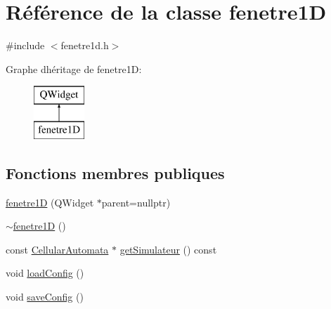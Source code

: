 \hypertarget{classfenetre1_d}{}\section{Référence de la classe fenetre1D}
\label{classfenetre1_d}


{\ttfamily \#include $<$fenetre1d.\+h$>$}

Graphe d\textquotesingle{}héritage de fenetre1D\+:\begin{figure}[H]
\begin{center}
\leavevmode
\includegraphics[height=2.000000cm]{classfenetre1_d}
\end{center}
\end{figure}
\subsection*{Fonctions membres publiques}
\begin{DoxyCompactItemize}
\item 
\mbox{\hyperlink{classfenetre1_d_adb843e57f0ba835052dfd216c82991ed}{fenetre1D}} (Q\+Widget $\ast$parent=nullptr)
\item 
\mbox{\hyperlink{classfenetre1_d_ad8ea627db7d11c383717afaa815f8dd0}{$\sim$fenetre1D}} ()
\item 
const \mbox{\hyperlink{class_cellular_automata}{Cellular\+Automata}} $\ast$ \mbox{\hyperlink{classfenetre1_d_a28ab62ea0d20e9f9dd5b3135a385314b}{get\+Simulateur}} () const
\item 
void \mbox{\hyperlink{classfenetre1_d_a13fdb7f89649288068f46b6aaf643053}{load\+Config}} ()
\item 
void \mbox{\hyperlink{classfenetre1_d_acc984ddd8dd83a65891a05b041614d21}{save\+Config}} ()
\end{DoxyCompactItemize}
